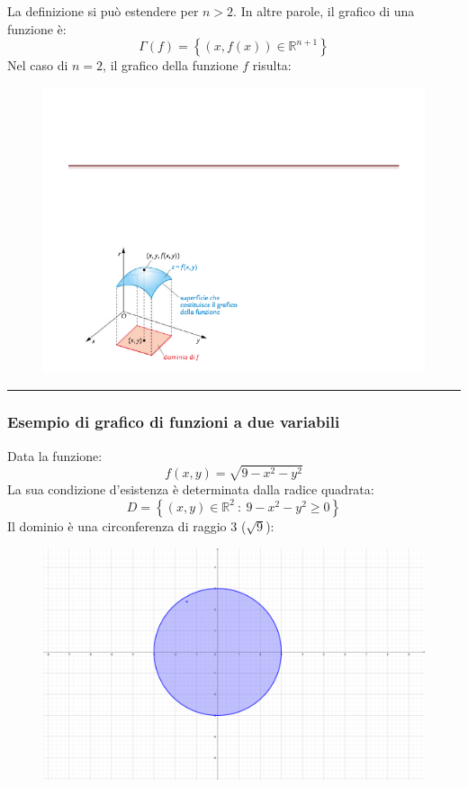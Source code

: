 \documentclass[a4paper]{article}
\newcommand{\longline}{\noindent\rule{\textwidth}{0.4pt}}
\begin{document}
	\noindent
	La definizione si può estendere per $n > 2$. In altre parole, il grafico di una funzione è:
	\begin{equation*}
		\Gamma\left(f\right) = \left\{\left(x, f\left(x\right)\right) \in \mathbb{R}^{n+1}\right\}
	\end{equation*}
	Nel caso di $n = 2$, il grafico della funzione $f$ risulta:
	\begin{figure}[!htp]
		\centering
		\includegraphics[width=.5\textwidth]{img/grafico_di_una_funzione.pdf}
	\end{figure}

	\longline

	\subsubsection{Esempio di grafico di funzioni a due variabili}\label{subsubsection: esempi di grafico di funzioni a due variabili}

	Data la funzione:
	\begin{equation*}
		f\left(x,y\right) = \sqrt{9 - x^{2} - y^{2}}
	\end{equation*}
	La sua condizione d'esistenza è determinata dalla radice quadrata:
	\begin{equation*}
		D = \left\{\left(x,y\right) \in \mathbb{R}^{2} \: : \: 9 - x^{2} - y^{2} \ge 0 \right\}
	\end{equation*}
	Il dominio è una circonferenza di raggio $3$ ($\sqrt{9}$):\newpage
	\begin{figure}[!htp]
		\centering
		\includegraphics[width=.5\textwidth]{img/grafico_di_funzioni-1.pdf}
	\end{figure}
\end{document}
